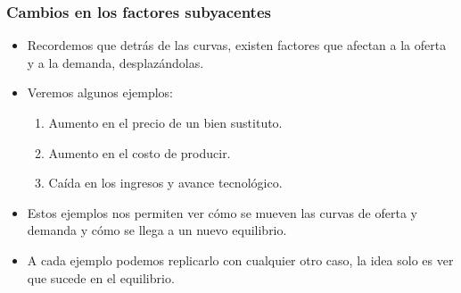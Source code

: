 \documentclass{beamer}
\begin{document}
\begin{frame}
\frametitle{Cambios en los factores subyacentes}
\begin{itemize}
    \item Recordemos que detrás de las curvas, existen factores que afectan a la oferta y a la demanda, desplazándolas.
    \item Veremos algunos ejemplos:
    \begin{enumerate}
        \item Aumento en el precio de un bien sustituto.
        \item Aumento en el costo de producir.
        \item Caída en los ingresos y avance tecnológico.
    \end{enumerate}
    \item Estos ejemplos nos permiten ver cómo se mueven las curvas de oferta y demanda y cómo se llega a un nuevo equilibrio.
    \item A cada ejemplo podemos replicarlo con cualquier otro caso, la idea solo es ver que sucede en el equilibrio.
\end{itemize}
\end{frame}
\end{document}
